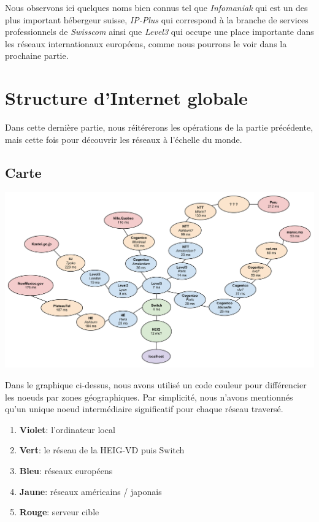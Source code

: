 \documentclass[11pt,a4paper]{article}
\begin{document}
Nous observons ici quelques noms bien connus tel que \textit{Infomaniak} qui est un des plus important hébergeur suisse, \textit{IP-Plus} qui correspond à la branche de services professionnels de \textit{Swisscom} ainsi que \textit{Level3} qui occupe une place importante dans les réseaux internationaux européens, comme nous pourrons le voir dans la prochaine partie.

\pagebreak

\section{Structure d'Internet globale}

Dans cette dernière partie, nous réitérerons les opérations de la partie précédente, mais cette fois pour découvrir les réseaux à l'échelle du monde.

\subsection{Carte}

\begin{center}
\includegraphics[width=15cm]{img_world}
\end{center}

Dans le graphique ci-dessus, nous avons utilisé un code couleur pour différencier les noeuds par zones géographiques. Par simplicité, nous n'avons mentionnés qu'un unique noeud intermédiaire significatif pour chaque réseau traversé.

\begin{enumerate}
	\item \textbf{Violet}: l'ordinateur local
	\item \textbf{Vert}: le réseau de la HEIG-VD puis Switch
	\item \textbf{Bleu}: réseaux européens
	\item \textbf{Jaune}: réseaux américains / japonais
	\item \textbf{Rouge}: serveur cible
\end{enumerate}
\end{document}
